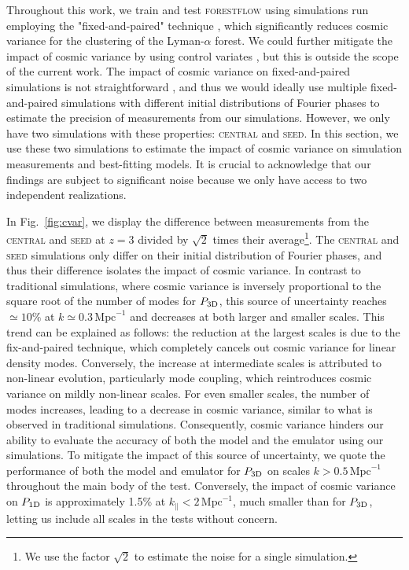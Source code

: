 \documentclass[longauth]{aa}
\newcommand{\lyaf}{Lyman-$\alpha$ forest\xspace}
\newcommand{\poned}{\ensuremath{P_{\rm 1D}}\xspace}
\newcommand{\pthreed}{\ensuremath{P_{\rm 3D}}\xspace}
\newcommand{\forestflow}{\textsc{forestflow}\xspace}
\newcommand{\simseed}{\textsc{seed}\xspace}
\newcommand{\simcentral}{\textsc{central}\xspace}
\newcommand{\iMpc}{\ensuremath{\,\mathrm{Mpc}^{-1}}}
\begin{document}
\begin{appendix}
Throughout this work, we train and test \forestflow using simulations run employing the "fixed-and-paired" technique \citep{angulo2016CosmologicalNbodySimulations, pontzen2016InvertedInitialConditions}, which significantly reduces cosmic variance for the clustering of the \lyaf \citep{anderson2019CosmologicalHydrodynamicSimulations}. We could further mitigate the impact of cosmic variance by using control variates \citep{Kokron2022}, but this is outside the scope of the current work. The impact of cosmic variance on fixed-and-paired simulations is not straightforward \citep{maion2022fpvariance}, and thus we would ideally use multiple fixed-and-paired simulations with different initial distributions of Fourier phases to estimate the precision of measurements from our simulations. However, we only have two simulations with these properties: \simcentral and \simseed. In this section, we use these two simulations to estimate the impact of cosmic variance on simulation measurements and best-fitting models. It is crucial to acknowledge that our findings are subject to significant noise because we only have access to two independent realizations.

In Fig.~\ref{fig:cvar}, we display the difference between measurements from the \simcentral and \simseed at $z=3$ divided by $\sqrt{2}$ times their average\footnote{We use the factor $\sqrt{2}$ to estimate the noise for a single simulation.}. The \simcentral and \simseed simulations only differ on their initial distribution of Fourier phases, and thus their difference isolates the impact of cosmic variance. In contrast to traditional simulations, where cosmic variance is inversely proportional to the square root of the number of modes for \pthreed, this source of uncertainty reaches $\simeq10\%$ at $k\simeq0.3\iMpc$ and decreases at both larger and smaller scales. This trend can be explained as follows: the reduction at the largest scales is due to the fix-and-paired technique, which completely cancels out cosmic variance for linear density modes. Conversely, the increase at intermediate scales is attributed to non-linear evolution, particularly mode coupling, which reintroduces cosmic variance on mildly non-linear scales. For even smaller scales, the number of modes increases, leading to a decrease in cosmic variance, similar to what is observed in traditional simulations. Consequently, cosmic variance hinders our ability to evaluate the accuracy of both the model and the emulator using our simulations. To mitigate the impact of this source of uncertainty, we quote the performance of both the model and emulator for \pthreed on scales $k>0.5\iMpc$ throughout the main body of the test. Conversely, the impact of cosmic variance on \poned is approximately 1.5\% at $k_\parallel<2\iMpc$, much smaller than for \pthreed, letting us include all scales in the tests without concern. 


\end{appendix}
\end{document}
